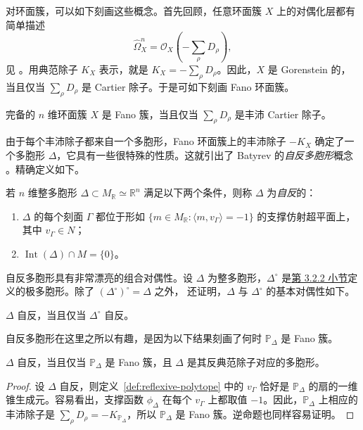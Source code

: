 对环面簇，可以如下刻画这些概念。首先回顾，任意环面簇 $X$ 上的对偶化层都有简单描述
\[
\widehat\Omega_X^n=\mathcal O_X\left(-\sum_\rho D_\rho\right),
\]
见 。用典范除子 $K_X$ 表示，就是 $K_X=-\sum_\rho D_\rho$。因此，$X$ 是 Gorenstein 的，当且仅当 $\sum_\rho D_\rho$ 是 Cartier 除子。于是可如下刻画 Fano 环面簇。
\begin{lemma}\label{lem:toric-fano}
完备的 $n$ 维环面簇 $X$ 是 Fano 簇，当且仅当 $\sum_\rho D_\rho$ 是丰沛 Cartier 除子。
\end{lemma}

由于每个丰沛除子都来自一个多胞形，Fano 环面簇上的丰沛除子 $-K_X$ 确定了一个多胞形 $\Delta$，它具有一些很特殊的性质。这就引出了 Batyrev 的\emph{自反多胞形}概念 。精确定义如下。
\begin{definition}\label{def:reflexive-polytope}
若 $n$ 维整多胞形 $\Delta\subset M_{\mathbb R}\simeq\mathbb R^n$ 满足以下两个条件，则称 $\Delta$ 为\emph{自反}的：
\begin{enumerate}[label=(\roman*)]
\item $\Delta$ 的每个刻面 $\Gamma$ 都位于形如 $\{m\in M_{\mathbb R}:\langle m,v_\Gamma\rangle=-1\}$ 的支撑仿射超平面上，其中 $v_\Gamma\in N$；
\item $\operatorname{Int}(\Delta)\cap M=\{0\}$。
\end{enumerate}
\end{definition}

自反多胞形具有非常漂亮的组合对偶性。设 $\Delta$ 为整多胞形，$\Delta^\circ$ 是\hyperref[subsec:toric-from-polytopes]{第 3.2.2 小节}定义的极多胞形。除了 $(\Delta^\circ)^\circ=\Delta$ 之外， 还证明，$\Delta$ 与 $\Delta^\circ$ 的基本对偶性如下。
\begin{lemma}\label{lem:reflexive-duality}
$\Delta$ 自反，当且仅当 $\Delta^\circ$ 自反。
\end{lemma}

自反多胞形在这里之所以有趣，是因为以下结果刻画了何时 $\mathbb P_\Delta$ 是 Fano 簇。
\begin{proposition}\label{prop:reflexive-fano}
$\Delta$ 自反，当且仅当 $\mathbb P_\Delta$ 是 Fano 簇，且 $\Delta$ 是其反典范除子对应的多胞形。
\end{proposition}

\begin{proof}
设 $\Delta$ 自反，则定义~\ref{def:reflexive-polytope} 中的 $v_\Gamma$ 恰好是 $\mathbb P_\Delta$ 的扇的一维锥生成元。容易看出，支撑函数 $\phi_\Delta$ 在每个 $v_\Gamma$ 上都取值 $-1$。因此，$\mathbb P_\Delta$ 上相应的丰沛除子是 $\sum_\rho D_\rho=-K_{\mathbb P_\Delta}$，所以 $\mathbb P_\Delta$ 是 Fano 簇。逆命题也同样容易证明。
\end{proof}


